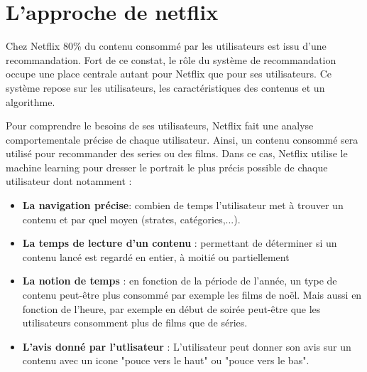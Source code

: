 \section{L'approche de netflix}





Chez Netflix 80\%\supercite{p80} du contenu consommé par les utilisateurs est issu d'une recommandation. Fort de ce constat, le rôle du système de recommandation occupe une place centrale autant pour Netflix que pour ses utilisateurs. Ce système repose sur les utilisateurs, les caractéristiques des contenus et un algorithme. 

\vspace{5mm} 

Pour comprendre le besoins de ses utilisateurs, Netflix fait une analyse comportementale précise de chaque utilisateur. Ainsi, un contenu consommé sera utilisé pour recommander des series ou des films. Dans ce cas, Netflix utilise le machine learning pour dresser le portrait le plus précis possible de chaque utilisateur dont notamment : 


\vspace{5mm}


\begin{itemize}
    \item \textbf{La navigation précise}: combien de temps l'utilisateur met à trouver un contenu  et par quel moyen (strates, catégories,...).
    \vspace{2mm}
    \item \textbf{La temps de lecture d'un contenu }: permettant de déterminer si un contenu lancé est regardé en entier, à moitié ou partiellement  
    \vspace{2mm}
    \item \textbf{La notion de temps} : en fonction de la période de l'année, un type de contenu peut-être plus consommé par exemple les films de noël. Mais aussi en fonction de l'heure, par exemple en début de soirée peut-être que les utilisateurs consomment plus de films que de séries. 
    \vspace{2mm}
    \item \textbf{L'avis donné par l'utlisateur} : L'utilisateur peut donner son avis sur un contenu avec un icone "pouce vers le haut" ou "pouce vers le bas". 
\end{itemize}

